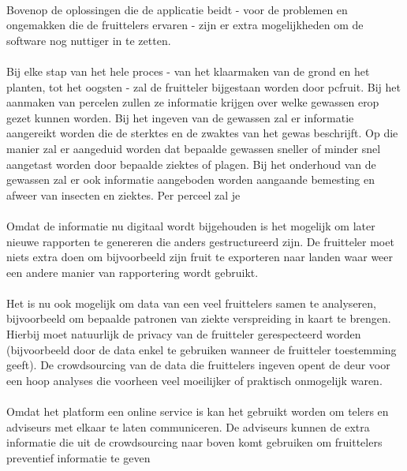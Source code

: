 \paragraph {} Bovenop de oplossingen die de applicatie beidt - voor de problemen en ongemakken
die de fruittelers ervaren - zijn er extra mogelijkheden om de software nog nuttiger in te zetten.

\paragraph {} Bij elke stap van het hele proces - van het klaarmaken van de grond en het planten, tot het oogsten - zal de fruitteler bijgestaan worden door pcfruit. Bij het aanmaken van percelen zullen ze informatie krijgen over welke gewassen erop gezet kunnen worden. Bij het ingeven van de gewassen zal er informatie aangereikt worden die de sterktes en de zwaktes van het gewas beschrijft. Op die manier zal er aangeduid worden dat bepaalde gewassen sneller of minder snel aangetast worden door bepaalde ziektes of plagen. Bij het onderhoud van de gewassen zal er ook informatie aangeboden worden aangaande bemesting en afweer van insecten en ziektes. Per perceel zal je

\paragraph {} Omdat de informatie nu digitaal wordt bijgehouden is het mogelijk om later
nieuwe rapporten te genereren die anders gestructureerd zijn. De fruitteler moet niets extra
doen om bijvoorbeeld zijn fruit te exporteren naar landen waar weer een andere manier van
rapportering wordt gebruikt.

\paragraph {} Het is nu ook mogelijk om data van een
veel fruittelers samen te analyseren, bijvoorbeeld om bepaalde patronen van ziekte verspreiding
in kaart te brengen. Hierbij moet natuurlijk de privacy van de fruitteler gerespecteerd
worden (bijvoorbeeld door de data enkel te gebruiken wanneer de fruitteler toestemming
geeft). De crowdsourcing van de data die fruittelers ingeven opent de deur voor een hoop
analyses die voorheen veel moeilijker of praktisch onmogelijk waren.

\paragraph {} Omdat het platform een online service is kan het gebruikt worden om telers
en adviseurs met elkaar te laten communiceren. De adviseurs kunnen de extra informatie die
uit de crowdsourcing naar boven komt gebruiken om fruittelers preventief informatie te
geven

